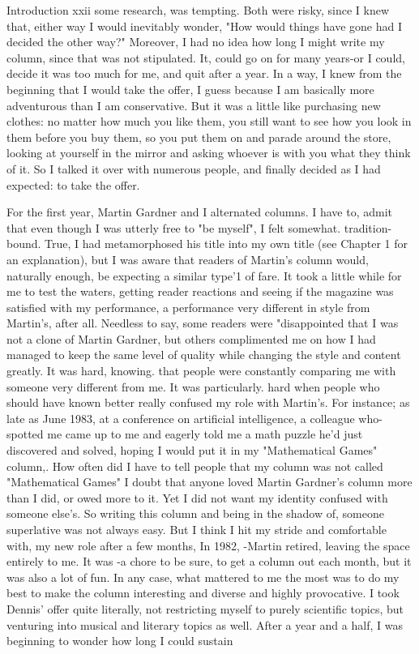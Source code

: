 Introduction                                                                       xxii some research, was tempting. Both were risky, since I knew that, either way I would inevitably wonder, "How would things have gone had I decided the other way?" Moreover, I had no idea how long I might write my column, since that was not stipulated. It, could go on for many years-or I could, decide it was too much for me, and quit after a year. In a way, I knew from the beginning that I would take the offer, I guess because I am basically more adventurous than I am conservative. But it was a little like purchasing new clothes: no matter how much you like them, you still want to see how you look in them before you buy them, so you put them on and parade around the store, looking at yourself in the mirror and asking whoever is with you what they think of it. So I talked it over with numerous people, and finally decided as I had expected: to take the offer. 
\separator

For the first year, Martin Gardner and I alternated columns. I have to, admit that even though I was utterly free to "be myself", I felt somewhat. tradition-bound. True, I had metamorphosed his title into my own title (see Chapter 1 for an explanation), but I was aware that readers of Martin's column would, naturally enough, be expecting a similar type'1 of fare. It took a little while for me to test the waters, getting reader reactions and seeing if the magazine was satisfied with my performance, a performance very different in style from Martin's, after all. Needless to say, some readers were "disappointed that I was not a clone of Martin Gardner, but others complimented me on how I had managed to keep the same level of quality while changing the style and content greatly. It was hard, knowing. that people were constantly comparing me with someone very different from me. It was particularly. hard when people who should have known better really confused my role with Martin's. For instance; as late as June 1983, at a conference on artificial intelligence, a colleague who-spotted me came up to me and eagerly told me a math puzzle he'd just discovered and solved, hoping I would put it in my "Mathematical Games" column,. How often did I have to tell people that my column was not called "Mathematical Games" I doubt that anyone loved Martin Gardner's column more than I did, or owed more to it. Yet I did not want my identity confused with someone else's. So writing this column and being in the shadow of, someone superlative was not always easy. But I think I hit my stride and comfortable with, my new role after a few months, In 1982, -Martin retired, leaving the space entirely to me. It was -a chore to be sure, to get a column out each month, but it was also a lot of fun. In any case, what mattered to me the most was to do my best to make the column interesting and diverse and highly provocative. I took Dennis' offer quite literally, not restricting myself to purely scientific topics, but venturing into musical and literary topics as well. After a year and a half, I was beginning to wonder how long I could sustain 



